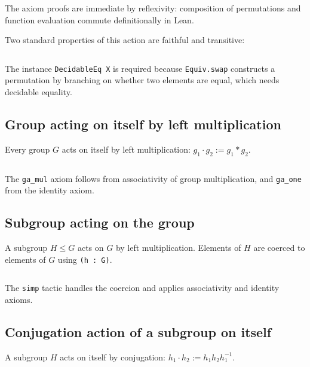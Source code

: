 \documentclass[
  12pt, %
]{assignment}
\newcommand{\leancodeurl}{}
\newcommand{\setleancodeurl}[1]{\renewcommand{\leancodeurl}{#1}}
\newcommand{\leancodefile}[3][]{%
  \setleancodeurl{#3}%
  \inputminted[fontsize=\footnotesize,breaklines,breakanywhere,tabsize=4,showspaces=false,linenos=true,#1]{lean4}{#2}%
}
\begin{document}
\leancodefile[firstline=21,lastline=28,firstnumber=21]{../lean/GroupAction/Examples.lean}{https://github.com/FrankieeW/GroupAction/blob/v1.2.0/lean/GroupAction/Examples.lean}

The axiom proofs are immediate by reflexivity: composition of permutations and function
evaluation commute definitionally in Lean.

Two standard properties of this action are faithful and transitive:
\leancodefile[firstline=30,lastline=43,firstnumber=30]{../lean/GroupAction/Examples.lean}{https://github.com/FrankieeW/GroupAction/blob/v1.2.0/lean/GroupAction/Examples.lean}
The instance \texttt{DecidableEq X} is required because \texttt{Equiv.swap} constructs a
permutation by branching on whether two elements are equal, which needs decidable equality.

\subsection{Group acting on itself by left multiplication}
Every group $G$ acts on itself by left multiplication: $g_1 \cdot g_2 := g_1 * g_2$.

\leancodefile[firstline=44,lastline=51,firstnumber=44]{../lean/GroupAction/Examples.lean}{https://github.com/FrankieeW/GroupAction/blob/v1.2.0/lean/GroupAction/Examples.lean}

The \texttt{ga\_mul} axiom follows from associativity of group multiplication, and
\texttt{ga\_one} from the identity axiom.

\subsection{Subgroup acting on the group}
A subgroup $H \leq G$ acts on $G$ by left multiplication. Elements of $H$ are coerced
to elements of $G$ using \texttt{(h : G)}.

\leancodefile[firstline=55,lastline=64,firstnumber=55]{../lean/GroupAction/Examples.lean}{https://github.com/FrankieeW/GroupAction/blob/v1.2.0/lean/GroupAction/Examples.lean}

The \texttt{simp} tactic handles the coercion and applies associativity and identity axioms.

\subsection{Conjugation action of a subgroup on itself}
A subgroup $H$ acts on itself by conjugation: $h_1 \cdot h_2 := h_1 h_2 h_1^{-1}$.
\end{document}

